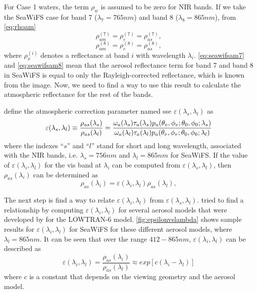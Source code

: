 For Case 1 waters, the term $\rho_{w}$ is assumed to be zero for NIR bands. If we take the SeaWiFS case for band 7 ($\lambda_7=765nm$) and band 8 ($\lambda_8=865nm$), from \autoref{eq:rhoam}
\begin{equation}\label{eq:seawifsam7}
    \rho_{am}^{(7)} = \rho_{c}^{(7)} = \rho_{as}^{(7)},
\end{equation}
\begin{equation}\label{eq:seawifsam8}
    \rho_{am}^{(8)} = \rho_{c}^{(8)} = \rho_{as}^{(8)},
\end{equation}
where $\rho_{x}^{(i)}$ denotes a reflectance at band $i$ with wavelength $\lambda_i$. \autoref{eq:seawifsam7} and \autoref{eq:seawifsam8} mean that the aerosol reflectance term for band 7 and band 8 in SeaWiFS is equal to only the Rayleigh-corrected reflectance, which is known from the image. Now, we need to find a way to use this result to calculate the atmospheric reflectance for the rest of the bands.

\citet{Gordon:1994} define the atmospheric correction parameter named \gls{sse} $\varepsilon(\lambda_s,\lambda_l)$ \citep{IOCCG:2010} as
\begin{equation}\label{eq:espilon}
  \varepsilon(\lambda_s,\lambda_l) \equiv \frac{\rho_{as}(\lambda_s)}{\rho_{as}(\lambda_l)} = \\
  \frac{\omega_a(\lambda_s)\tau_a(\lambda_s)p_a(\theta_v,\phi_v;\theta_0,\phi_0;\lambda_s)}{\omega_a(\lambda_l)\tau_a(\lambda_l)p_a(\theta_v,\phi_v;\theta_0,\phi_0;\lambda_l)}
\end{equation}
where the indexes ``$s$'' and ``$l$'' stand for short and long wavelength, associated with the NIR bands, i.e. $\lambda_s=756nm$ and $\lambda_l=865nm$ for SeaWiFS. If the value of $\varepsilon(\lambda_i,\lambda_l)$ for the \gls{vis} band at $\lambda_i$ can be computed from $\varepsilon(\lambda_s,\lambda_l)$, then $\rho_{as}(\lambda_i)$ can be determined as
\begin{equation}\label{eq:rholambda_i}
  \rho_{as}(\lambda_i) = \varepsilon(\lambda_i,\lambda_l)\rho_{as}(\lambda_l),
\end{equation}

The next step is find a way to relate $\varepsilon(\lambda_i,\lambda_l)$ from $\varepsilon(\lambda_s,\lambda_l)$. \citet{Gordon:1994} tried to find a relationship by computing  $\varepsilon(\lambda_i,\lambda_l)$ for several aerosol models that were developed by \citet{Shettle:1979} for the LOWTRAN-6 model. \autoref{fig:epsilonvslambda} shows sample results for $\varepsilon(\lambda_i,\lambda_l)$ for SeaWiFS for these different aerosol models, where $\lambda_l=865nm$. It can be seen that over the range $412-865nm$, $\varepsilon(\lambda_i,\lambda_l)$ can be described as
\begin{equation}\label{eq:epsilonexp}
  \varepsilon(\lambda_i,\lambda_l) = \frac{\rho_{as}(\lambda_i)}{\rho_{as}(\lambda_l)} \approx exp[c(\lambda_i-\lambda_l)]
\end{equation}
where $c$ is a constant that depends on the viewing geometry and the aerosol model. 

